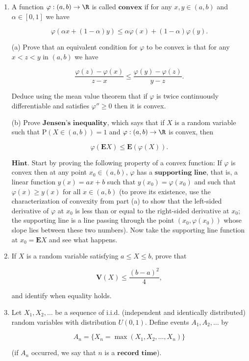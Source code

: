\begin{enumerate}[label=\arabic*.]
\item A function $\varphi:(a,b)\to\R$ is called
$\textbf{convex}$ if for any $x,y\in (a,b)$ and
$\alpha\in [0,1]$ we have

\[
\varphi(\alpha x + (1-\alpha)y) \le \alpha \varphi(x) + (1-\alpha) \varphi(y).
\]

\noindent (a) Prove that an equivalent condition for $\varphi$
to be convex is that for any $x<z<y$ in $(a,b)$ we
have

\[
\frac{\varphi(z)-\varphi(x)}{z-x} \le \frac{\varphi(y)-\varphi(z)}{y-z}.
\]

\noindent Deduce using the mean value theorem that if $\varphi$
is twice continuously differentiable and satisfies
$\varphi''\ge 0$ then it is convex.

(b) Prove $\textbf{Jensen's inequality}$, which says
that if $X$ is a random variable such that
$\mathrm{P}(X\in (a,b))=1$ and $\varphi:(a,b)\to\R$
is convex, then

\[
\varphi(\mathbf{E}X) \le \mathbf{E}(\varphi(X)).
\]

\noindent $\textbf{Hint.}$ Start by proving the following
property of a convex function: If $\varphi$ is convex
then at any point $x_0\in (a,b)$, $\varphi$ has a
$\textbf{supporting line}$, that is, a linear
function $y(x)=ax+b$ such that $y(x_0)=\varphi(x_0)$
and such that $\varphi(x)\ge y(x)$ for all $x\in(a,b)$
(to prove its existence, use the characterization of
convexity from part (a) to show that the left-sided
derivative of $\varphi$ at $x_0$ is less than or
equal to the right-sided derivative at $x_0$; the
supporting line is a line passing through the point
$(x_0,\varphi(x_0))$ whose slope lies between these
two numbers). Now take the supporting line function at
$x_0=\mathbf{E}X$ and see what happens.

\item If $X$ is a random variable satisfying $a\le X\le b$,
prove that

\[
\mathbf{V}(X) \le \frac{(b-a)^2}{4},
\]

\noindent and identify when equality holds.

\item Let $X_1, X_2, \ldots$ be a sequence of i.i.d.
(independent and identically distributed) random
variables with distribution $U(0,1)$. Define events
$A_1, A_2, \ldots$ by

\[
A_n = \{ X_n = \max(X_1,X_2,\ldots,X_n) \}
\]

\noindent (if $A_n$ occurred, we say that $n$ is a
$\textbf{record time}$).


\end{enumerate}
